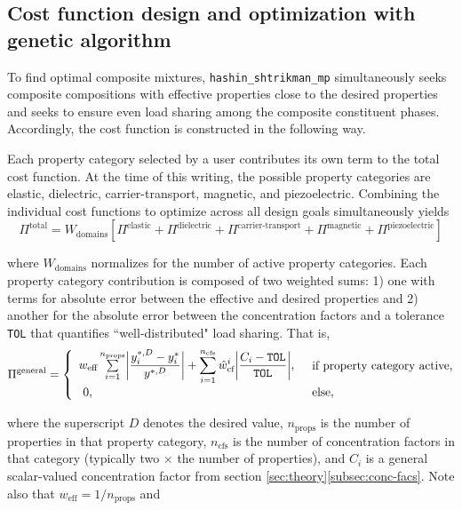 \documentclass[letterpaper,12pt]{formatfile}
\begin{document}
\subsection{Cost function design and optimization with genetic algorithm} \label{subsec:GA}
To find optimal composite mixtures, \verb|hashin_shtrikman_mp| simultaneously seeks composite compositions with effective properties close to the desired properties and seeks to ensure even load sharing among the composite constituent phases. Accordingly, the cost function is constructed in the following way. 

Each property category selected by a user contributes its own term to the total cost function. At the time of this writing, the possible property categories are elastic, dielectric, carrier-transport, magnetic, and piezoelectric. Combining the individual cost functions to optimize across all design goals simultaneously yields 
\begin{equation}
\Pi^{\text{total}} = W_{\text{domains}}\left[ \Pi^{\text{elastic}} + \Pi^{\text{dielectric}} + \Pi^{\text{carrier-transport}} + \Pi^{\text{magnetic}} + \Pi^{\text{piezoelectric}} \right]
\label{eqn:pi}
\end{equation}

\noindent where $W_{\text{domains}}$ normalizes for the number of active property categories. Each property category contribution is composed of two weighted sums: 1) one with terms for absolute error between the effective and desired properties and 2) another for the absolute error between the concentration factors and a tolerance \verb|TOL| that quantifies ``well-distributed" load sharing. That is,
\begin{equation}
\Pi^{\text{general}} =
\begin{cases}
\begin{array}{l}
w_{\text{eff}} \sum\limits_{i=1}^{n_{\text{props}}} \biggl\vert\displaystyle\frac{y_{i}^{*,D} - y_{i}^{*}}{y^{*,D}}\biggr\vert 
+ \sum\limits_{i=1}^{n_{\text{cfs}}} \hat{w}_{\text{cf}}^{i} \biggl\vert\displaystyle\frac{C_{i}-\texttt{TOL}}{\texttt{TOL}}\biggr\vert,
\end{array} & \text{if property category active}, \\
\hspace{3mm} 0, & \text{else},
\end{cases}
\label{eqn:pi-gen}
\end{equation}

\noindent where the superscript $D$ denotes the desired value, $n_{\text{props}}$ is the number of properties in that property category, $n_{\text{cfs}}$ is the number of concentration factors in that category (typically two $\times$ the number of properties), and $C_{i}$ is a general scalar-valued concentration factor from section \ref{sec:theory}\ref{subsec:conc-facs}. Note also that $w_{\text{eff}} = 1/n_{\text{props}}$ and
\end{document}
